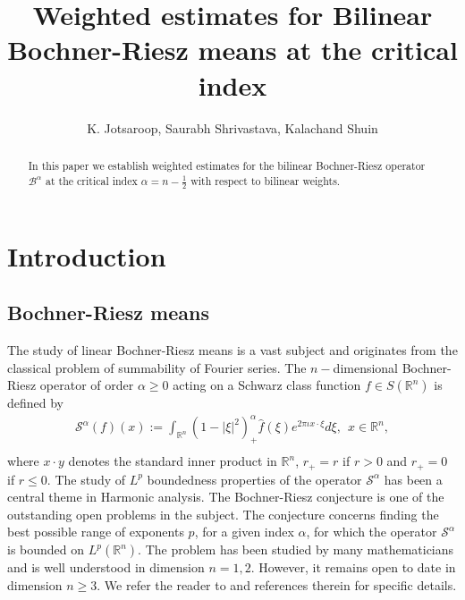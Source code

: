 \documentclass[a4paper,12pt]{amsart}
\author{K. Jotsaroop, Saurabh Shrivastava, Kalachand Shuin}
\newcommand{\R}{{\mathbb {R}}}
\begin{document}
\title[Bilinear Bochner-Riesz means at the critical index]{Weighted estimates for Bilinear Bochner-Riesz means at the critical index}

\begin{abstract}
In this paper we establish weighted estimates for the bilinear Bochner-Riesz operator $\mathcal B^{\alpha}$ at the critical index $\alpha=n-\frac{1}{2}$ with respect to bilinear weights. 
\end{abstract}

\maketitle
\section{Introduction}
\subsection{Bochner-Riesz means}
The study of linear Bochner-Riesz means is a vast subject and originates from the classical problem of summability of Fourier series. The $n-$dimensional Bochner-Riesz operator of order $\alpha\geq 0$ acting on a Schwarz class function $f\in S(\R^n)$ is defined by
\begin{eqnarray*}
\mathcal {S}^{\alpha}(f)(x):=\int_{\mathbb{R}^{n}}(1-|\xi|^{2})^{\alpha}_{+}\hat{f}(\xi)e^{2\pi \iota x\cdot\xi}d\xi,~~x\in \R^n, \\
\end{eqnarray*}
where $x\cdot y$ denotes the standard inner product in $\R^n$, $r_+=r$ if $r> 0$ and $r_+=0$ if $r\leq 0$. 
The study of $L^p$ boundedness properties of the operator $\mathcal {S}^{\alpha}$ has been a central theme in Harmonic analysis. The Bochner-Riesz conjecture is one of the outstanding open problems in the subject. The conjecture concerns finding the best possible range of exponents $p$, for a given index  $\alpha$, for which the operator $\mathcal {S}^{\alpha}$ is bounded on  $L^p(\R^n)$. The problem has been studied by many mathematicians and is well understood in dimension $n=1,2$. However, it remains open to date in dimension $n\geq 3$. We refer the reader to \cite{B1,B2,F1,F2, Lee2, Lee1} and references therein for specific details. 
\end{document}
